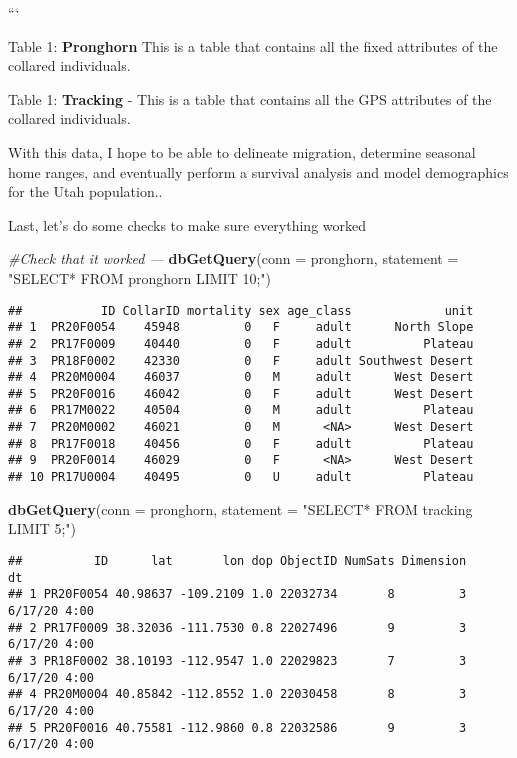 \documentclass[]{book}
\newenvironment{Shaded}{\begin{snugshade}}{\end{snugshade}}
\newcommand{\KeywordTok}[1]{\textcolor[rgb]{0.13,0.29,0.53}{\textbf{#1}}}
\newcommand{\DataTypeTok}[1]{\textcolor[rgb]{0.13,0.29,0.53}{#1}}
\newcommand{\StringTok}[1]{\textcolor[rgb]{0.31,0.60,0.02}{#1}}
\newcommand{\CommentTok}[1]{\textcolor[rgb]{0.56,0.35,0.01}{\textit{#1}}}
\newcommand{\NormalTok}[1]{#1}
\begin{document}
```

Table 1: \textbf{Pronghorn} This is a table that contains all the fixed
attributes of the collared individuals.

Table 1: \textbf{Tracking} - This is a table that contains all the GPS
attributes of the collared individuals.

With this data, I hope to be able to delineate migration, determine
seasonal home ranges, and eventually perform a survival analysis and
model demographics for the Utah population..

Last, let's do some checks to make sure everything worked

\begin{Shaded}
\begin{Highlighting}[]
\CommentTok{#Check that it worked ---}
\KeywordTok{dbGetQuery}\NormalTok{(}\DataTypeTok{conn =}\NormalTok{ pronghorn, }\DataTypeTok{statement =} \StringTok{"SELECT* FROM pronghorn LIMIT 10;"}\NormalTok{)}
\end{Highlighting}
\end{Shaded}

\begin{verbatim}
##           ID CollarID mortality sex age_class             unit
## 1  PR20F0054    45948         0   F     adult      North Slope
## 2  PR17F0009    40440         0   F     adult          Plateau
## 3  PR18F0002    42330         0   F     adult Southwest Desert
## 4  PR20M0004    46037         0   M     adult      West Desert
## 5  PR20F0016    46042         0   F     adult      West Desert
## 6  PR17M0022    40504         0   M     adult          Plateau
## 7  PR20M0002    46021         0   M      <NA>      West Desert
## 8  PR17F0018    40456         0   F     adult          Plateau
## 9  PR20F0014    46029         0   F      <NA>      West Desert
## 10 PR17U0004    40495         0   U     adult          Plateau
\end{verbatim}

\begin{Shaded}
\begin{Highlighting}[]
\KeywordTok{dbGetQuery}\NormalTok{(}\DataTypeTok{conn =}\NormalTok{ pronghorn, }\DataTypeTok{statement =} \StringTok{"SELECT* FROM tracking LIMIT 5;"}\NormalTok{)}
\end{Highlighting}
\end{Shaded}

\begin{verbatim}
##          ID      lat       lon dop ObjectID NumSats Dimension           dt
## 1 PR20F0054 40.98637 -109.2109 1.0 22032734       8         3 6/17/20 4:00
## 2 PR17F0009 38.32036 -111.7530 0.8 22027496       9         3 6/17/20 4:00
## 3 PR18F0002 38.10193 -112.9547 1.0 22029823       7         3 6/17/20 4:00
## 4 PR20M0004 40.85842 -112.8552 1.0 22030458       8         3 6/17/20 4:00
## 5 PR20F0016 40.75581 -112.9860 0.8 22032586       9         3 6/17/20 4:00
\end{verbatim}
\end{document}
